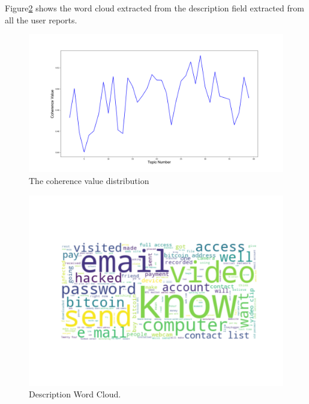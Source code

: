 Figure\ref{fig:word-cloud} shows the word cloud extracted from the description field extracted from all the user reports.
\begin{figure}[tbp]
\centerline{\includegraphics[width=\columnwidth]{images/coherence_graph.png}}
\caption{The coherence value distribution}
\label{fig:coherence}
\end{figure}
\begin{figure}[tbp]
\centerline{\includegraphics[width=\columnwidth]{images/word_cloud.png}}
\caption{Description Word Cloud.}
\label{fig:word-cloud}
\end{figure}



\noindent{}




